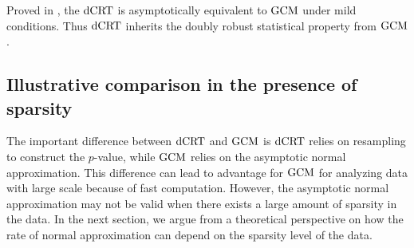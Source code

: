 \documentclass[12pt]{article}
\theoremstyle{definition}
\newcommand{\dCRT}{\textnormal{dCRT}} 					%
\newcommand{\GCM}{\textnormal{GCM}}						%
\begin{document}
Proved in \citet{Niu2022a}, the $\dCRT$ is asymptotically equivalent to $\GCM$ under mild conditions. Thus $\dCRT$ inherits the doubly robust statistical property from $\GCM$.



\subsection{Illustrative comparison in the presence of sparsity}\label{sec:finite_sample}

The important difference between $\dCRT$ and $\GCM$ is $\dCRT$ relies on resampling to construct the $p$-value, while $\GCM$ relies on the asymptotic normal approximation. This difference can lead to advantage for $\GCM$ for analyzing data with large scale because of fast computation. However, the asymptotic normal approximation may not be valid when there exists a large amount of sparsity in the data. In the next section, we argue from a theoretical perspective on how the rate of normal approximation can depend on the sparsity level of the data. 
\end{document}
